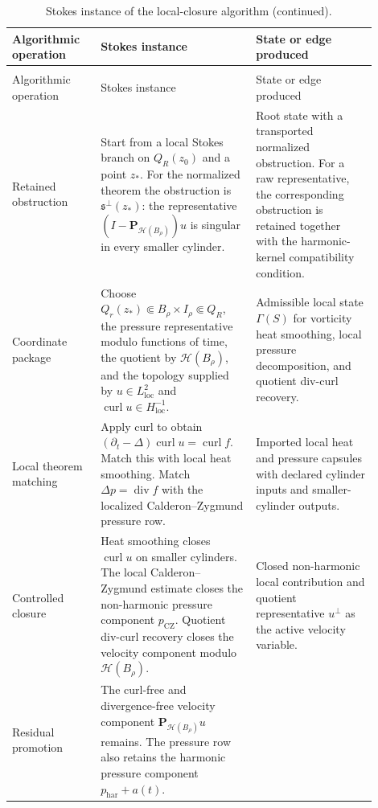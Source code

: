 \documentclass[11pt]{article}
\theoremstyle{plain}
\theoremstyle{definition}
\theoremstyle{remark}
\newcommand{\curl}{\operatorname{curl}}
\newcommand{\divergence}{\operatorname{div}}
\newcommand{\loc}{\mathrm{loc}}
\newcommand{\calH}{\mathcal H}
\newcommand{\proj}{\mathbf P}
\begin{document}
\begingroup
\small
\begin{longtable}{@{}L{0.22\linewidth}L{0.38\linewidth}L{0.30\linewidth}@{}}
\caption{Stokes instance of the local-closure algorithm.}
\label{tab:stokes-algorithm-instance}\\
\toprule
Algorithmic operation & Stokes instance & State or edge produced \\
\midrule
\endfirsthead
\caption[]{Stokes instance of the local-closure algorithm (continued).}\\
\toprule
Algorithmic operation & Stokes instance & State or edge produced \\
\midrule
\endhead
Retained obstruction &
Start from a local Stokes branch on \(Q_R(z_0)\) and a point \(z_*\).  For
the normalized theorem the obstruction is
\(\mathfrak s^\perp(z_*)\): the representative
\((I-\proj_{\calH(B_\rho)})u\) is singular in every smaller cylinder. &
Root state with a transported normalized obstruction.  For a raw
representative, the corresponding obstruction is retained together with the
harmonic-kernel compatibility condition. \\
\addlinespace
Coordinate package &
Choose \(Q_r(z_*)\Subset B_\rho\times I_\rho\Subset Q_R\), the pressure
representative modulo functions of time, the quotient by
\(\calH(B_\rho)\), and the topology supplied by
\(u\in L^2_{\loc}\) and \(\curl u\in H^{-1}_{\loc}\). &
Admissible local state \(\Gamma(S)\) for vorticity heat smoothing, local
pressure decomposition, and quotient div-curl recovery. \\
\addlinespace
Local theorem matching &
Apply curl to obtain
\((\partial_t-\Delta)\curl u=\curl f\).  Match this with local heat
smoothing.  Match \(\Delta p=\divergence f\) with the localized
Calderon--Zygmund pressure row. &
Imported local heat and pressure capsules with declared cylinder inputs and
smaller-cylinder outputs. \\
\addlinespace
Controlled closure &
Heat smoothing closes \(\curl u\) on smaller cylinders.  The local
Calderon--Zygmund estimate closes the non-harmonic pressure component
\(p_{\mathrm{CZ}}\).  Quotient div-curl recovery closes the velocity
component modulo \(\calH(B_\rho)\). &
Closed non-harmonic local contribution and quotient representative
\(u^\perp\) as the active velocity variable. \\
\addlinespace
Residual promotion &
The curl-free and divergence-free velocity component
\(\proj_{\calH(B_\rho)}u\) remains.  The pressure row also retains the
harmonic pressure component \(p_{\mathrm{har}}+a(t)\). &

\end{longtable}
\end{document}
